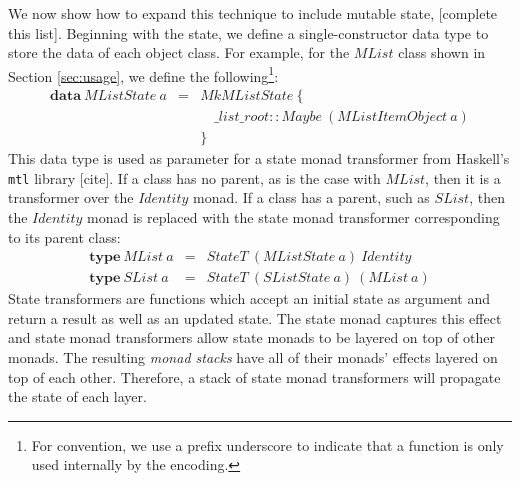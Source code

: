 \documentclass[runningheads,a4paper]{llncs}
\newcommand{\todo}[1]{[{\color{blue}#1}]}
\begin{document}
We now show how to expand this technique to include mutable state, \todo{complete this list}. Beginning with the state, we define a single-constructor data type to store the data of each object class. For example, for the $\mathit{MList}$ class shown in Section \ref{sec:usage}, we define the following\footnote{For convention, we use a prefix underscore to indicate that a function is only used internally by the encoding.}:
\begin{displaymath}
\begin{array}{lcl}
\mathbf{data}~\mathit{MListState}~a & = & \mathit{MkMListState}~\{\\
 && \quad \_ list \_ root :: \mathit{Maybe}~(\mathit{MListItemObject~a}) \\
 && \}
\end{array}
\end{displaymath}
This data type is used as parameter for a state monad transformer from Haskell's \texttt{mtl} library \todo{cite}. If a class has no parent, as is the case with $\mathit{MList}$, then it is a transformer over the $\mathit{Identity}$ monad. If a class has a parent, such as $\mathit{SList}$, then the $\mathit{Identity}$ monad is replaced with the state monad transformer corresponding to its parent class:
\begin{displaymath}
\begin{array}{lcl}
\mathbf{type}~\mathit{MList}~a & = & \mathit{StateT}~(\mathit{MListState}~a)~\mathit{Identity} \\
\mathbf{type}~\mathit{SList}~a & = & \mathit{StateT}~(\mathit{SListState}~a)~(\mathit{MList}~a)
\end{array}
\end{displaymath}
State transformers are functions which accept an initial state as argument and return a result as well as an updated state. The state monad captures this effect and state monad transformers allow state monads to be layered on top of other monads. The resulting \emph{monad stacks} have all of their monads' effects layered on top of each other. Therefore, a stack of state monad transformers will propagate the state of each layer.
\end{document}
